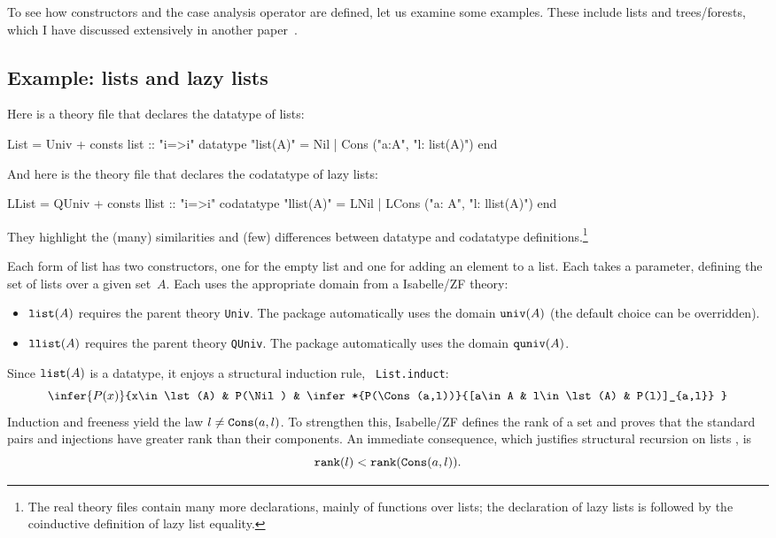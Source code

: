 To see how constructors and the case analysis operator are defined, let us
examine some examples.  These include lists and trees/forests, which I have
discussed extensively in another paper~\cite{paulson-set-II}.


\subsection{Example: lists and lazy lists}\label{lists-sec}
Here is a theory file that declares the datatype of lists:
\begin{ttbox} 
List = Univ + 
consts  list :: "i=>i"
datatype "list(A)" = Nil | Cons ("a:A", "l: list(A)")
end
\end{ttbox}
And here is the theory file that declares the codatatype of lazy lists:
\begin{ttbox}
LList = QUniv + 
consts  llist :: "i=>i"
codatatype "llist(A)" = LNil | LCons ("a: A", "l: llist(A)")
end
\end{ttbox}
They highlight the (many) similarities and (few) differences between
datatype and codatatype definitions.\footnote{The real theory files contain
  many more declarations, mainly of functions over lists; the declaration
  of lazy lists is followed by the coinductive definition of lazy list
  equality.} 

Each form of list has two constructors, one for the empty list and one for
adding an element to a list.  Each takes a parameter, defining the set of
lists over a given set~$A$.  Each uses the appropriate domain from a
Isabelle/ZF theory:
\begin{itemize}
\item $\hbox{\tt list}(A)$ requires the parent theory {\tt Univ}.  The package
  automatically uses the domain $\hbox{\tt univ}(A)$ (the default choice can be
  overridden). 

\item $\hbox{\tt llist}(A)$ requires the parent theory {\tt QUniv}.  The package
  automatically uses the domain $\hbox{\tt quniv}(A)$.
\end{itemize}

Since $\hbox{\tt list}(A)$ is a datatype, it enjoys a structural induction rule, {\tt
  List.induct}:
\[ \infer{P(x)}{x\in\lst(A) & P(\Nil)
        & \infer*{P(\Cons(a,l))}{[a\in A & l\in\lst(A) & P(l)]_{a,l}} }
\] 
Induction and freeness yield the law $l\not=\hbox{\tt Cons}(a,l)$.  To strengthen this,
Isabelle/ZF defines the rank of a set and proves that the standard pairs and
injections have greater rank than their components.  An immediate consequence,
which justifies structural recursion on lists \cite[\S4.3]{paulson-set-II},
is
\[ \hbox{\tt rank}(l) < \hbox{\tt rank}(\hbox{\tt Cons}(a,l)). \]


